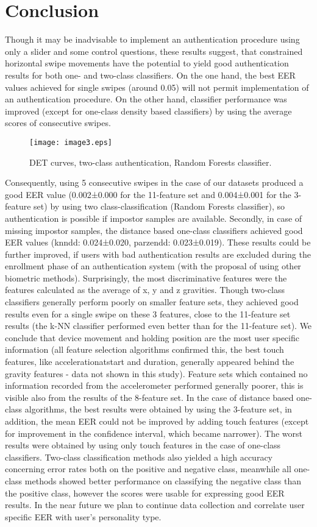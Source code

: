 \documentclass[referee]{raa}            %
\begin{document}
\section{Conclusion}
\label{sect:conclusion}
Though it may be inadvisable to implement an authentication procedure using only a slider and some control questions, these results suggest, that constrained horizontal swipe movements have the potential to yield good authentication results for both one- and two-class classifiers. On the one hand, the best EER values achieved for single swipes (around 0.05) will not permit implementation of an authentication procedure. On the other hand, classifier performance was improved (except for one-class density based classifiers) by using the average scores of consecutive swipes.
\begin{figure}
   \centering
   \texttt{[image: image3.eps]}
   \caption{DET curves, two-class authentication, Random Forests classifier.}
   \label{Fig3}
   \end{figure}
\par
Consequently, using 5 consecutive swipes in the case of our datasets produced a good EER value (0.002±0.000 for the 11-feature set and 0.004±0.001 for the 3-feature set) by using two class-classification (Random Forests classifier), so authentication is possible if impostor samples are available. Secondly, in case of missing impostor samples, the distance based one-class classifiers achieved good EER values (knndd: 0.024±0.020, parzendd: 0.023±0.019). These results could be further improved, if users with bad authentication results are excluded during the enrollment phase of an authentication system (with the proposal of using other biometric methods). Surprisingly, the most discriminative features were the features calculated as the average of x, y and z gravities. Though two-class classifiers generally perform poorly on smaller feature sets, they achieved good results even for a single swipe on these 3 features, close to the 11-feature set results (the k-NN classifier performed even better than for the 11-feature set). We conclude that device movement and holding position are the most user specific information (all feature selection algorithms confirmed this, the best touch features, like accelerationatstart and duration, generally appeared behind the gravity features - data not shown in this study). Feature sets which contained no information recorded from the accelerometer performed generally poorer, this is visible also from the results of the 8-feature set. In the case of distance based one-class algorithms, the best results were obtained by using the 3-feature set, in addition, the mean EER could not be improved by adding touch features (except for improvement in the confidence interval, which became narrower). The worst results were obtained by using only touch features in the case of one-class classifiers. Two-class classification methods also yielded a high accuracy concerning error rates both on the positive and negative class, meanwhile all one-class methods showed better performance on classifying the negative class than the positive class, however the scores were usable for expressing good EER results. In the near future we plan to continue data collection and correlate user specific EER with user’s personality type.
\end{document}
